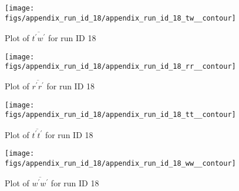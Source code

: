 \begin{figure}[H]
\centering
\texttt{[image: figs/appendix\_run\_id\_18/appendix\_run\_id\_18\_tw\_\_contour]}
\caption{Plot of $\overline{t^\prime w^\prime}$ for run ID 18}
\label{fig:appendix_run_id_18_tw__contour}
\end{figure}


\begin{figure}[H]
\centering
\texttt{[image: figs/appendix\_run\_id\_18/appendix\_run\_id\_18\_rr\_\_contour]}
\caption{Plot of $\overline{r^\prime r^\prime}$ for run ID 18}
\label{fig:appendix_run_id_18_rr__contour}
\end{figure}


\begin{figure}[H]
\centering
\texttt{[image: figs/appendix\_run\_id\_18/appendix\_run\_id\_18\_tt\_\_contour]}
\caption{Plot of $\overline{t^\prime t^\prime}$ for run ID 18}
\label{fig:appendix_run_id_18_tt__contour}
\end{figure}


\begin{figure}[H]
\centering
\texttt{[image: figs/appendix\_run\_id\_18/appendix\_run\_id\_18\_ww\_\_contour]}
\caption{Plot of $\overline{w^\prime w^\prime}$ for run ID 18}
\label{fig:appendix_run_id_18_ww__contour}
\end{figure}


